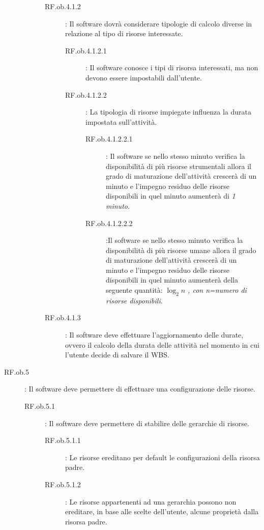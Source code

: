 \begin{description}
\begin{description}
\begin{description}
\begin{description}
			\end{description}
		\item[RF.ob.4.1.2]: Il software dovr\`{a} considerare tipologie di calcolo diverse in relazione al tipo di risorse interessate.
			\begin{description}
			\item[RF.ob.4.1.2.1]: Il software conosce i tipi di risorsa interessati, ma non devono essere impostabili dall\textquoteright{}utente.
			\item[RF.ob.4.1.2.2]: La tipologia di risorse impiegate influenza la durata impostata sull\textquoteright{}attivit\`{a}.
				\begin{description}
				\item[RF.ob.4.1.2.2.1]: Il software se nello stesso minuto verifica la disponibilit\`{a} di pi\`{u} risorse strumentali allora il grado di maturazione dell\textquoteright{}attivit\`{a} crescer\`{a} di un minuto e l\textquoteright{}impegno residuo delle risorse disponibili in quel minuto aumenter\`{a} di \textit{1 minuto}.
				\item[RF.ob.4.1.2.2.2]:Il software se nello stesso minuto verifica la disponibilit\`{a} di pi\`{u} risorse umane allora il grado di maturazione dell\textquoteright{}attivit\`{a} crescer\`{a} di un minuto e l\textquoteright{}impegno residuo delle risorse disponibili in quel minuto aumenter\`{a} della seguente quantit\`{a}: \textit{$ \log_2 n $ , con n=numero di risorse disponibili}.
				\end{description}
			\end{description}
		\item[RF.ob.4.1.3]: Il software deve effettuare l\textquoteright{}aggiornamento delle durate, ovvero il calcolo della durata delle attivit\`{a} nel momento in cui l\textquoteright{}utente decide di salvare il WBS.
		\end{description}
	\end{description}
\item[RF.ob.5]: Il software deve permettere di effettuare una configurazione delle risorse.
	\begin{description}
	\item[RF.ob.5.1]: Il software deve permettere di stabilire delle gerarchie di risorse.
		\begin{description}
		\item[RF.ob.5.1.1]: Le risorse ereditano per default le configurazioni della risorsa padre.
		\item[RF.ob.5.1.2]: Le risorse appartenenti ad una gerarchia possono non ereditare, in base alle scelte dell\textquoteright{}utente, alcune propriet\`{a} dalla risorsa padre.

\end{description}
\end{description}
\end{description}
